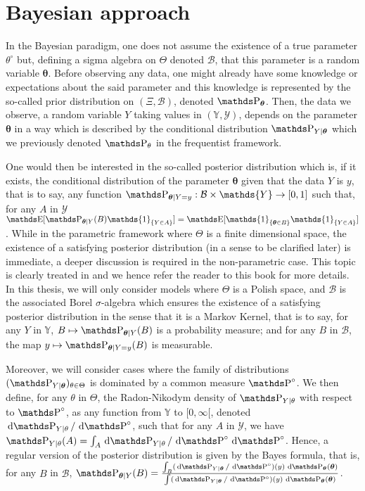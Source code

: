 \section{Bayesian approach}\label{INTRO_BAYES}

In the Bayesian paradigm, one does not assume the existence of a true parameter $\theta^{\circ}$ but, defining a sigma algebra on $\Theta$ denoted  $\mathcal{B}$, that this parameter is a random variable $\boldsymbol{\theta}$.
Before observing any data, one might already have some knowledge or expectations about the said parameter and this knowledge is represented by the so-called prior distribution on $(\Xi, \mathcal{B})$, denoted $\P_{\boldsymbol{\theta}}$.
Then, the data we observe, a random variable $Y$ taking values in $(\mathds{Y}, \mathcal{Y})$, depends on the parameter $\boldsymbol{\theta}$ in a way which is described by the conditional distribution $\P_{Y \vert \boldsymbol{\theta}}$ which we previously denoted $\P_{\theta}$ in the frequentist framework.

One would then be interested in the so-called posterior distribution which is, if it exists, the conditional distribution of the parameter $\boldsymbol{\theta}$ given that the data $Y$ is $y$, that is to say, any function $\P_{\boldsymbol{\theta}\vert Y=y}: \mathcal{B} \times \mathds{Y}\to [0, 1]$ such that, for any $A$ in $\mathcal{Y}$ $\E[\P_{\boldsymbol{\theta} \vert Y}(B) \mathds{1}_{\{Y \in A\}}] = \E[\mathds{1}_{\{\boldsymbol{\theta} \in B\}} \mathds{1}_{\{Y \in A\}}]$.
While in the parametric framework where $\Theta$ is a finite dimensional space, the existence of a satisfying posterior distribution (in a sense to be clarified later) is immediate, a deeper discussion is required in the non-parametric case.
This topic is clearly treated in  and we hence refer the reader to this book for more details.
In this thesis, we will only consider models where $\Theta$ is a Polish space, and $\mathcal{B}$ is the associated Borel $\sigma$-algebra which ensures the existence of a satisfying posterior distribution in the sense that it is a Markov Kernel, that is to say, for any $Y$ in $\mathds{Y}$, $B \mapsto \P_{\boldsymbol{\theta} \vert Y}(B)$ is a probability measure; and for any $B$ in $\mathcal{B}$, the map $y \mapsto \P_{\boldsymbol{\theta} \vert Y= y}(B)$ is measurable.

Moreover, we will consider cases where the family of distributions $(\P_{Y \vert \boldsymbol{\theta}})_{\theta \in \Theta}$ is dominated by a common measure $\P^{\circ}$.
We then define, for any $\theta$ in $\Theta$, the Radon-Nikodym density of $\P_{Y \vert \theta}$ with respect to $\P^{\circ}$, as any function from $\mathds{Y}$ to $[0, \infty[$, denoted $\d\P_{Y \vert \theta}/\d \P^{\circ}$, such that for any $A$ in $\mathcal{Y}$, we have $\P_{Y \vert \theta}(A) = \int_{A} \d\P_{Y \vert \theta}/\d \P^{\circ} \d \P^{\circ}$.
Hence, a regular version of the posterior distribution is given by the Bayes formula, that is, for any $B$ in $\mathcal{B}$, $\P_{\boldsymbol{\theta} \vert Y}(B) = \tfrac{\int_{B} (\d \P_{Y \vert \boldsymbol{\theta}}/\d \P^{\circ})(y) \d \P_{\boldsymbol{\theta}}(\boldsymbol{\theta})}{\int (\d \P_{Y \vert \boldsymbol{\theta}}/\d \P^{\circ})(y) \d \P_{\boldsymbol{\theta}}(\boldsymbol{\theta})}$.


